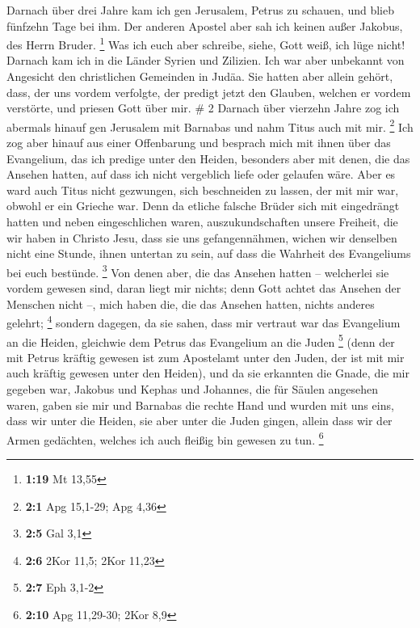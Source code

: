  Darnach über drei Jahre kam ich gen Jerusalem, Petrus zu
schauen, und blieb fünfzehn Tage bei ihm.  Der anderen
Apostel aber sah ich keinen außer Jakobus, des Herrn Bruder. \footnote{\textbf{1:19}
  Mt 13,55}  Was ich euch aber schreibe, siehe, Gott
weiß, ich lüge nicht!  Darnach kam ich in die Länder
Syrien und Zilizien.  Ich war aber unbekannt von
Angesicht den christlichen Gemeinden in Judäa.  Sie
hatten aber allein gehört, dass, der uns vordem verfolgte, der predigt
jetzt den Glauben, welchen er vordem verstörte,  und
priesen Gott über mir. \# 2  Darnach über vierzehn Jahre
zog ich abermals hinauf gen Jerusalem mit Barnabas und nahm Titus auch
mit mir. \footnote{\textbf{2:1} Apg 15,1-29; Apg 4,36} 
Ich zog aber hinauf aus einer Offenbarung und besprach mich mit ihnen
über das Evangelium, das ich predige unter den Heiden, besonders aber
mit denen, die das Ansehen hatten, auf dass ich nicht vergeblich liefe
oder gelaufen wäre.  Aber es ward auch Titus nicht
gezwungen, sich beschneiden zu lassen, der mit mir war, obwohl er ein
Grieche war.  Denn da etliche falsche Brüder sich mit
eingedrängt hatten und neben eingeschlichen waren, auszukundschaften
unsere Freiheit, die wir haben in Christo Jesu, dass sie uns
gefangennähmen,  wichen wir denselben nicht eine Stunde,
ihnen untertan zu sein, auf dass die Wahrheit des Evangeliums bei euch
bestünde. \footnote{\textbf{2:5} Gal 3,1}  Von denen aber,
die das Ansehen hatten -- welcherlei sie vordem gewesen sind, daran
liegt mir nichts; denn Gott achtet das Ansehen der Menschen nicht --,
mich haben die, die das Ansehen hatten, nichts anderes gelehrt;
\footnote{\textbf{2:6} 2Kor 11,5; 2Kor 11,23}  sondern
dagegen, da sie sahen, dass mir vertraut war das Evangelium an die
Heiden, gleichwie dem Petrus das Evangelium an die Juden \footnote{\textbf{2:7}
  Eph 3,1-2}  (denn der mit Petrus kräftig gewesen ist zum
Apostelamt unter den Juden, der ist mit mir auch kräftig gewesen unter
den Heiden),  und da sie erkannten die Gnade, die mir
gegeben war, Jakobus und Kephas und Johannes, die für Säulen angesehen
waren, gaben sie mir und Barnabas die rechte Hand und wurden mit uns
eins, dass wir unter die Heiden, sie aber unter die Juden gingen,
 allein dass wir der Armen gedächten, welches ich auch
fleißig bin gewesen zu tun. \footnote{\textbf{2:10} Apg 11,29-30; 2Kor
  8,9}

